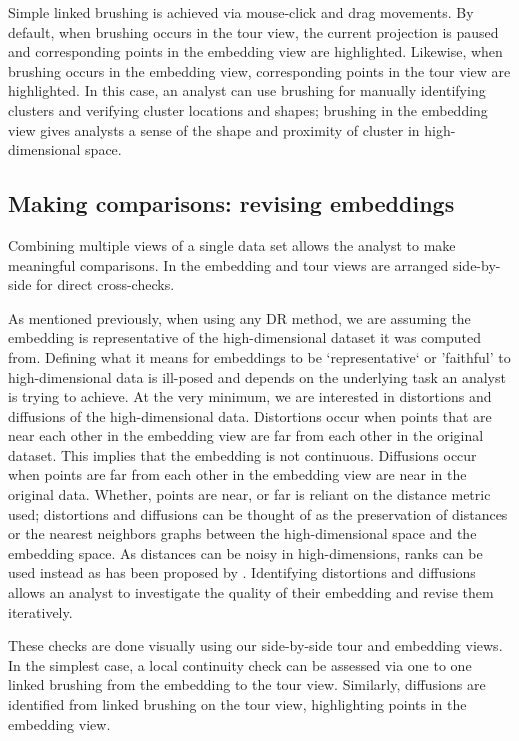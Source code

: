 \documentclass[article,notitle]{jdssv}
\begin{document}
Simple linked brushing is achieved via mouse-click and drag movements. By
default, when brushing occurs in the tour view, the current projection is
paused and corresponding points in the embedding view are highlighted.
Likewise, when brushing occurs in the embedding view, corresponding points in
the tour view are highlighted. In this case, an analyst can use brushing for
manually identifying clusters and verifying cluster locations and shapes;
brushing in the embedding view gives analysts a sense of the shape and
proximity of cluster in high-dimensional space.

\hypertarget{making-comparisons-revising-embeddings}{%
\subsection{Making comparisons: revising embeddings}\label{making-comparisons-revising-embeddings}}

Combining multiple views of a single data set allows the analyst
to make meaningful comparisons. In  the embedding
and tour views are arranged side-by-side for direct cross-checks.

As mentioned previously, when using any DR method, we are assuming the
embedding is representative of the high-dimensional dataset it was computed
from. Defining what it means for embeddings to be `representative` or 'faithful'
to high-dimensional data is ill-posed and depends on the underlying task an
analyst is trying to achieve. At the very minimum, we are interested in
distortions and diffusions of the high-dimensional data. Distortions occur when
points that are near each other in the embedding view are far from each other
in the original dataset. This implies that the embedding is not continuous.
Diffusions occur when points are far from each other in the embedding view are
near in the original data. Whether, points are near, or far is reliant on the
distance metric used; distortions and diffusions can be thought of as the
preservation of distances or the nearest neighbors graphs between the
high-dimensional space and the embedding space. As distances can be noisy in
high-dimensions, ranks can be used instead as has been proposed by \citet{Lee2009-zb}.
Identifying distortions and diffusions allows an analyst to investigate the
quality of their embedding and revise them iteratively.

These checks are done visually using our side-by-side tour and embedding views.
In the simplest case, a local continuity check can be assessed via one to
one linked brushing from the embedding to the tour view. Similarly, diffusions
are identified from linked brushing on the tour view, highlighting points
in the embedding view.
\end{document}
